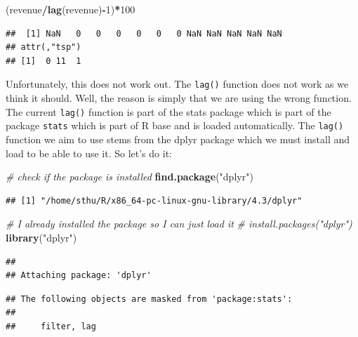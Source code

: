 \documentclass[
  12pt,
  oneside]{book}
\newenvironment{Shaded}{\begin{snugshade}}{\end{snugshade}}
\newcommand{\CommentTok}[1]{\textcolor[rgb]{0.56,0.35,0.01}{\textit{#1}}}
\newcommand{\DecValTok}[1]{\textcolor[rgb]{0.00,0.00,0.81}{#1}}
\newcommand{\FunctionTok}[1]{\textcolor[rgb]{0.13,0.29,0.53}{\textbf{#1}}}
\newcommand{\NormalTok}[1]{#1}
\newcommand{\SpecialCharTok}[1]{\textcolor[rgb]{0.81,0.36,0.00}{\textbf{#1}}}
\newcommand{\StringTok}[1]{\textcolor[rgb]{0.31,0.60,0.02}{#1}}
\begin{document}
\begin{Shaded}
\begin{Highlighting}[]
\NormalTok{(revenue}\SpecialCharTok{/}\FunctionTok{lag}\NormalTok{(revenue)}\SpecialCharTok{{-}}\DecValTok{1}\NormalTok{)}\SpecialCharTok{*}\DecValTok{100} 
\end{Highlighting}
\end{Shaded}

\begin{verbatim}
##  [1] NaN   0   0   0   0   0   0 NaN NaN NaN NaN NaN
## attr(,"tsp")
## [1]  0 11  1
\end{verbatim}

Unfortunately, this does not work out. The \texttt{lag()} function does not work as we think it should. Well, the reason is simply that we are using the wrong function. The current \texttt{lag()} function is part of the stats package which is part of the package \texttt{stats} which is part of R base and is loaded automatically. The \texttt{lag()} function we aim to use stems from the dplyr package which we must install and load to be able to use it. So let's do it:

\begin{Shaded}
\begin{Highlighting}[]
\CommentTok{\# check if the package is installed}
\FunctionTok{find.package}\NormalTok{(}\StringTok{"dplyr"}\NormalTok{)}
\end{Highlighting}
\end{Shaded}

\begin{verbatim}
## [1] "/home/sthu/R/x86_64-pc-linux-gnu-library/4.3/dplyr"
\end{verbatim}

\begin{Shaded}
\begin{Highlighting}[]
\CommentTok{\# I already installed the package so I can just load it}
\CommentTok{\# install.packages("dplyr")}
\FunctionTok{library}\NormalTok{(}\StringTok{"dplyr"}\NormalTok{)}
\end{Highlighting}
\end{Shaded}

\begin{verbatim}
## 
## Attaching package: 'dplyr'
\end{verbatim}

\begin{verbatim}
## The following objects are masked from 'package:stats':
## 
##     filter, lag
\end{verbatim}
\end{document}
